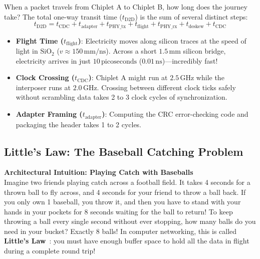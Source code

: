When a packet travels from Chiplet A to Chiplet B, how long does the journey take? The total one-way transit time ($t_{\mathrm{D2D}}$) is the sum of several distinct steps:
\begin{equation}
    t_{\mathrm{D2D}} = t_{\mathrm{CDC}} + t_{\mathrm{adapter}} + t_{\mathrm{PHY\_tx}} + t_{\mathrm{flight}} + t_{\mathrm{PHY\_rx}} + t_{\mathrm{deskew}} + t_{\mathrm{CDC}}
    \label{eq:d2d-latency}
\end{equation}
\begin{itemize}
    \item \textbf{Flight Time ($t_{\mathrm{flight}}$)}: Electricity moves along silicon traces at the speed of light in $\mathrm{SiO_2}$ ($v \approx 150\,\mathrm{mm/ns}$). Across a short $1.5\,\mathrm{mm}$ silicon bridge, electricity arrives in just $10\,\mathrm{picoseconds}$ ($0.01\,\mathrm{ns}$)—incredibly fast!
    \item \textbf{Clock Crossing ($t_{\mathrm{CDC}}$)}: Chiplet A might run at $2.5\,\mathrm{GHz}$ while the interposer runs at $2.0\,\mathrm{GHz}$. Crossing between different clock ticks safely without scrambling data takes 2 to 3 clock cycles of synchronization.
    \item \textbf{Adapter Framing ($t_{\mathrm{adapter}}$)}: Computing the CRC error-checking code and packaging the header takes 1 to 2 cycles.
\end{itemize}

\subsection{Little's Law: The Baseball Catching Problem}

\begin{svgraybox}
\textbf{Architectural Intuition: Playing Catch with Baseballs} \\
Imagine two friends playing catch across a football field. It takes 4 seconds for a thrown ball to fly across, and 4 seconds for your friend to throw a ball back. If you only own 1 baseball, you throw it, and then you have to stand with your hands in your pockets for 8 seconds waiting for the ball to return! 
To keep throwing a ball every single second without ever stopping, how many balls do you need in your bucket? Exactly 8 balls!
In computer networking, this is called \textbf{Little's Law}~\cite{Little1961}: you must have enough buffer space to hold all the data in flight during a complete round trip!
\end{svgraybox}

